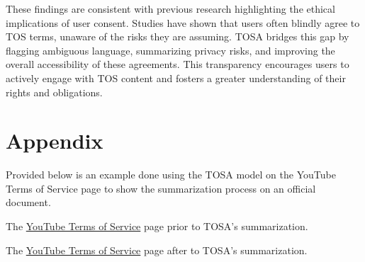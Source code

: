 \documentclass[sigconf, nonacm]{acmart}
\begin{document}
These findings are consistent with previous research highlighting the ethical implications of user consent. Studies have shown that users often blindly agree to TOS terms, unaware of the risks they are assuming. TOSA bridges this gap by flagging ambiguous language, summarizing privacy risks, and improving the overall accessibility of these agreements. This transparency encourages users to actively engage with TOS content and fosters a greater understanding of their rights and obligations.





\onecolumn

\section*{Appendix}
Provided below is an example done using the TOSA model on the YouTube Terms of Service page to show the summarization process on an official document.

The {\color{blue}\href{https://github.com/itsJohnny21/TOSA/blob/main/resources/simplified_tos/YouTube%20TOS.pdf}{YouTube Terms of Service}} page prior to TOSA's summarization.

The {\color{blue}\href{https://github.com/itsJohnny21/TOSA/blob/main/resources/simplified_tos/Simplified%20YouTube%20TOS.pdf}{YouTube Terms of Service}} page after to TOSA's summarization.
\end{document}
